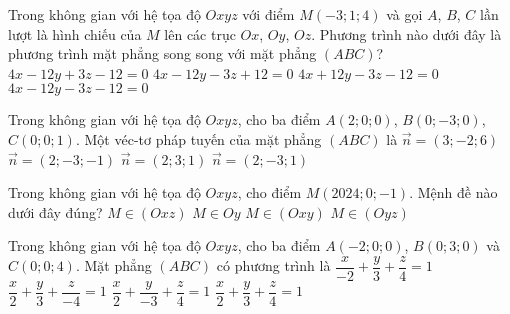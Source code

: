 \begin{ex}%
	Trong không gian với hệ tọa độ $Oxyz$ với điểm $M(-3;1;4)$ và gọi $A$, $B$, $C$ lần lượt là hình chiếu của $M$ lên các trục $Ox$, $Oy$, $Oz$. Phương trình nào dưới đây là phương trình mặt phẳng song song với mặt phẳng $(ABC)$?
	\choice
	{$4x-12y+3z-12=0$}
	{$4x-12y-3z+12=0$}
	{$4x+12y-3z-12=0$}
	{\True $4x-12y-3z-12=0$}
\end{ex}

\begin{ex}%
	Trong không gian với hệ tọa độ $Oxyz$, cho ba điểm $A(2;0;0)$, $B(0;-3;0)$, $C(0;0;1)$. Một véc-tơ pháp tuyến của mặt phẳng $(ABC)$ là
	\choice
	{\True $\overrightarrow{n}=(3;-2;6)$}
	{$\overrightarrow{n}=(2;-3;-1)$}
	{$\overrightarrow{n}=(2;3;1)$}
	{$\overrightarrow{n}=(2;-3;1)$}
\end{ex}

\begin{ex}%
	Trong không gian với hệ tọa độ $Oxyz$, cho điểm $M(2024;0;-1)$. Mệnh đề nào dưới đây đúng?
	\choice
	{\True $M\in(Oxz)$}
	{$M\in Oy$}
	{$M\in(Oxy)$}
	{$M\in(Oyz)$}
\end{ex}

\begin{ex}%
	Trong không gian với hệ tọa độ $Oxyz$, cho ba điểm $A(-2;0;0)$, $B(0;3;0)$ và $C(0;0;4)$. Mặt phẳng $(ABC)$ có phương trình là
	\choice
	{\True $\dfrac{x}{-2}+\dfrac{y}{3}+\dfrac{z}{4}=1$}
	{$\dfrac{x}{2}+\dfrac{y}{3}+\dfrac{z}{-4}=1$}
	{$\dfrac{x}{2}+\dfrac{y}{-3}+\dfrac{z}{4}=1$}
	{$\dfrac{x}{2}+\dfrac{y}{3}+\dfrac{z}{4}=1$}
\end{ex}

